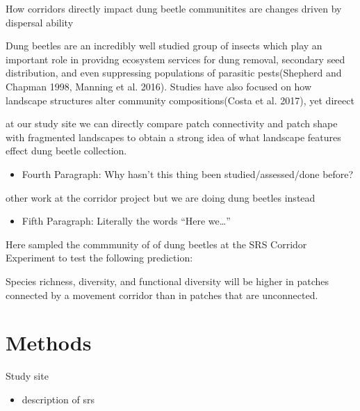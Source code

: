 \documentclass[
]{article}
\providecommand{\tightlist}{%
  \setlength{\itemsep}{0pt}\setlength{\parskip}{0pt}}
\begin{document}
How corridors directly impact dung beetle communitites are changes
driven by dispersal ability

Dung beetles are an incredibly well studied group of insects which play
an important role in providng ecosystem services for dung removal,
secondary seed distribution, and even suppressing populations of
parasitic pests(Shepherd and Chapman 1998, Manning et al. 2016). Studies
have also focused on how landscape structures alter community
compositions(Costa et al. 2017), yet direect

at our study site we can directly compare patch connectivity and patch
shape with fragmented landscapes to obtain a strong idea of what
landscape features effect dung beetle collection.

\begin{itemize}
\tightlist
\item
  Fourth Paragraph: Why hasn't this thing been studied/assessed/done
  before?
\end{itemize}

other work at the corridor project but we are doing dung beetles instead

\begin{itemize}
\tightlist
\item
  Fifth Paragraph: Literally the words ``Here we\ldots{}''
\end{itemize}

Here sampled the commmunity of of dung beetles at the SRS Corridor
Experiment to test the following prediction:

Species richness, diversity, and functional diversity will be higher in
patches connected by a movement corridor than in patches that are
unconnected.

\hypertarget{methods}{%
\section{Methods}\label{methods}}

Study site

\begin{itemize}
\tightlist
\item
  description of srs
\end{itemize}
\end{document}
